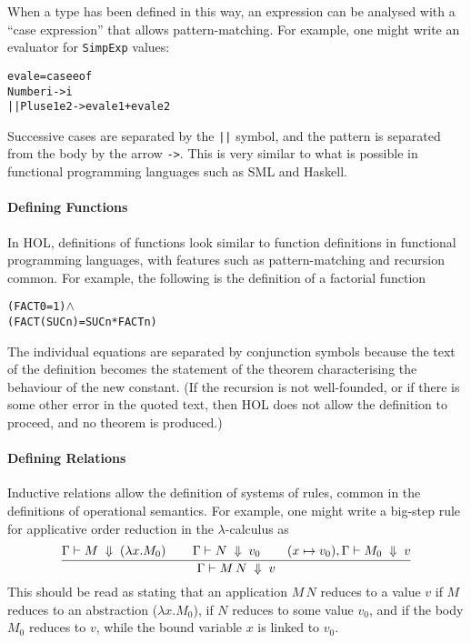 \documentclass[11pt]{article}
\begin{document}
\vspace{1ex}  When a type has been
defined in this way, an expression can be analysed with a ``case
expression'' that allows pattern-matching.  For example, one might
write an evaluator for \texttt{SimpExp} values:
\begin{alltt}
   eval e  =  case e of
                 Number i -> i
              || Plus e1 e2 -> eval e1 + eval e2
\end{alltt}
Successive cases are separated by the \texttt{||} symbol, and the
pattern is separated from the body by the arrow \texttt{->}.  This is
very similar to what is possible in functional programming languages
such as SML and Haskell.


\paragraph{Defining Functions}
In HOL, definitions of functions look similar to function definitions
in functional programming languages, with features such as
pattern-matching and recursion common.  For example, the following is
the definition of a factorial function
\begin{alltt}
   (FACT 0 = 1) \(\land\)
   (FACT (SUC n) = SUC n * FACT n)
\end{alltt}
The individual equations are separated by conjunction symbols because
the text of the definition becomes the statement of the theorem
characterising the behaviour of the new constant.  (If the recursion
is not well-founded, or if there is some other error in the quoted
text, then HOL does not allow the definition to proceed, and no
theorem is produced.)

\paragraph{Defining Relations}
Inductive relations allow the definition of systems of rules, common
in the definitions of operational semantics.  For example, one might
write a big-step rule for applicative order reduction in the
$\lambda$-calculus as
\[
\infer{\Gamma \vdash M\,N\;\Downarrow \;v}{\Gamma \vdash M \;\Downarrow\; (\lambda x. M_0) \;\;&
  \;\;\Gamma \vdash N \;\Downarrow\;v_0\;\; & \;\;(x\mapsto v_0),\Gamma \vdash M_0 \;\Downarrow\; v}
\]
This should be read as stating that an application $M\,N$ reduces to a
value $v$ if $M$ reduces to an abstraction ($\lambda x. M_0$), if $N$
reduces to some value $v_0$, and if the body $M_0$ reduces to $v$,
while the bound variable $x$ is linked to $v_0$.
\end{document}
